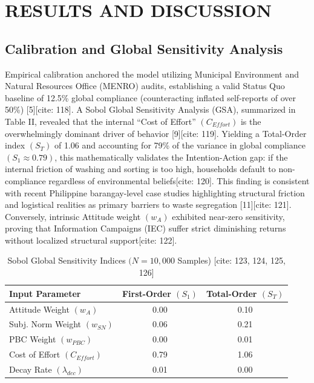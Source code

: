 \documentclass[conference]{IEEEtran}
\begin{document}
\section{RESULTS AND DISCUSSION}

\subsection{Calibration and Global Sensitivity Analysis}
Empirical calibration anchored the model utilizing Municipal Environment and Natural Resources Office (MENRO) audits, establishing a valid Status Quo baseline of 12.5\% global compliance (counteracting inflated self-reports of over 50\%) [5][cite: 118]. A Sobol Global Sensitivity Analysis (GSA), summarized in Table II, revealed that the internal ``Cost of Effort'' $(C_{Effort})$ is the overwhelmingly dominant driver of behavior [9][cite: 119]. Yielding a Total-Order index $(S_{T})$ of 1.06 and accounting for 79\% of the variance in global compliance $(S_{1}\approx0.79)$, this mathematically validates the Intention-Action gap: if the internal friction of washing and sorting is too high, households default to non-compliance regardless of environmental beliefs[cite: 120]. This finding is consistent with recent Philippine barangay-level case studies highlighting structural friction and logistical realities as primary barriers to waste segregation [11][cite: 121]. Conversely, intrinsic Attitude weight $(w_{A})$ exhibited near-zero sensitivity, proving that Information Campaigns (IEC) suffer strict diminishing returns without localized structural support[cite: 122].

\begin{table}[htbp]
\caption{Sobol Global Sensitivity Indices $(N=10,000$ Samples) [cite: 123, 124, 125, 126]}
\begin{center}
\begin{tabular}{|l|c|c|}
\hline
\textbf{Input Parameter} & \textbf{First-Order $(S_{1})$} & \textbf{Total-Order $(S_{T})$} \\
\hline
Attitude Weight $(w_{A})$ & 0.00 & 0.10 \\
Subj. Norm Weight $(w_{SN})$ & 0.06 & 0.21 \\
PBC Weight $(w_{PBC})$ & 0.00 & 0.01 \\
Cost of Effort $(C_{Effort})$ & 0.79 & 1.06 \\
Decay Rate $(\lambda_{dec})$ & 0.01 & 0.00 \\
\hline
\end{tabular}
\end{center}
\end{table}
\end{document}
